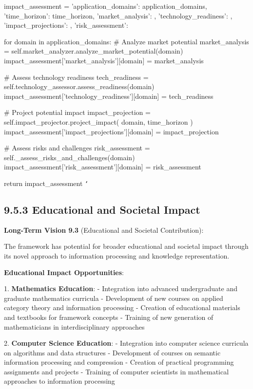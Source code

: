         impact_assessment = {
            'application_domains': application_domains,
            'time_horizon': time_horizon,
            'market_analysis': {},
            'technology_readiness': {},
            'impact_projections': {},
            'risk_assessment': {}
        }
        
        for domain in application_domains:
            \# Analyze market potential
            market_analysis = self.market_analyzer.analyze_market_potential(domain)
            impact_assessment['market_analysis'][domain] = market_analysis
            
            \# Assess technology readiness
            tech_readiness = self.technology_assessor.assess_readiness(domain)
            impact_assessment['technology_readiness'][domain] = tech_readiness
            
            \# Project potential impact
            impact_projection = self.impact_projector.project_impact(
                domain, time_horizon
            )
            impact_assessment['impact_projections'][domain] = impact_projection
            
            \# Assess risks and challenges
            risk_assessment = self._assess_risks_and_challenges(domain)
            impact_assessment['risk_assessment'][domain] = risk_assessment
        
        return impact_assessment
\texttt{`}

\subsection{9.5.3 Educational and Societal Impact}

\textbf{Long-Term Vision 9.3} (Educational and Societal Contribution):

The framework has potential for broader educational and societal impact through its novel approach to information processing and knowledge representation.

\textbf{Educational Impact Opportunities}:

1. \textbf{Mathematics Education}:
   - Integration into advanced undergraduate and graduate mathematics curricula
   - Development of new courses on applied category theory and information processing
   - Creation of educational materials and textbooks for framework concepts
   - Training of new generation of mathematicians in interdisciplinary approaches

2. \textbf{Computer Science Education}:
   - Integration into computer science curricula on algorithms and data structures
   - Development of courses on semantic information processing and compression
   - Creation of practical programming assignments and projects
   - Training of computer scientists in mathematical approaches to information processing

